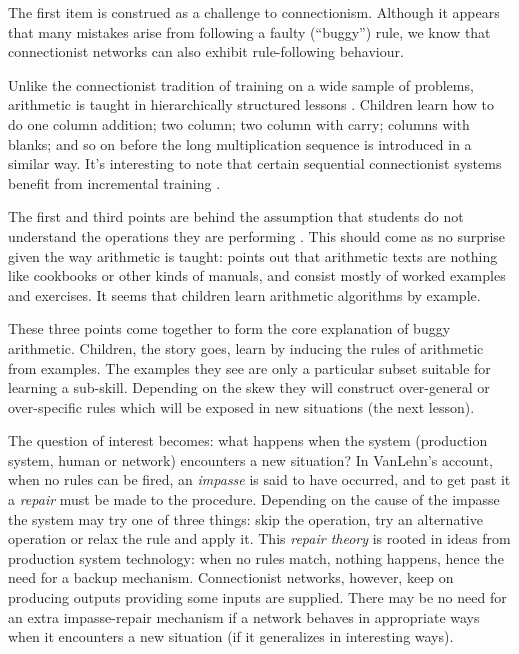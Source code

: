 The first item is construed as a challenge to connectionism.  Although it
appears that many mistakes arise from following a faulty (``buggy'') rule,
we know that connectionist networks can also exhibit rule-following
behaviour.

Unlike the connectionist tradition of training on a wide sample of
problems, arithmetic is taught in hierarchically structured lessons
\cite{resnpsyc}. Children learn how to do one column addition; two column;
two column with carry; columns with blanks; and so on before the
long multiplication sequence is introduced in a similar way.  It's
interesting to note that certain sequential connectionist systems benefit
from incremental training \cite{elmaincr}.

The first and third points are behind the assumption that students do not
understand the operations they are performing \cite[pp.~38--40]{mindbugs}.
This should come as no surprise given the way arithmetic is taught:
 points out that arithmetic texts are nothing like
cookbooks or other kinds of manuals, and consist
mostly of worked examples
and exercises. It seems that children learn arithmetic algorithms by
example.

These three points come together to form the core explanation of buggy
arithmetic.  Children, the story goes, learn by inducing the rules of
arithmetic from examples.  The examples they see are only a particular
subset suitable for learning a sub-skill.  Depending on the skew they will
construct over-general or over-specific rules which will be exposed in new
situations (the next lesson).

The question of interest becomes: what happens when the system (production
system, human or network) encounters a new situation?  In VanLehn's
account, when no rules can be fired, an {\em impasse} is said to have
occurred, and to get past it a {\em repair} must be made to the procedure.
Depending on the cause of the impasse the system may try one of three
things: skip the operation, try an alternative operation or relax the rule
and apply it.  This {\em repair theory} is rooted in ideas from production
system technology: when no rules match, nothing happens, hence the need for
a backup mechanism. Connectionist networks, however, keep on producing
outputs providing some inputs are supplied. There may be no need for an
extra impasse-repair mechanism if a network behaves in appropriate ways when
it encounters a new situation (if it generalizes in interesting ways).


